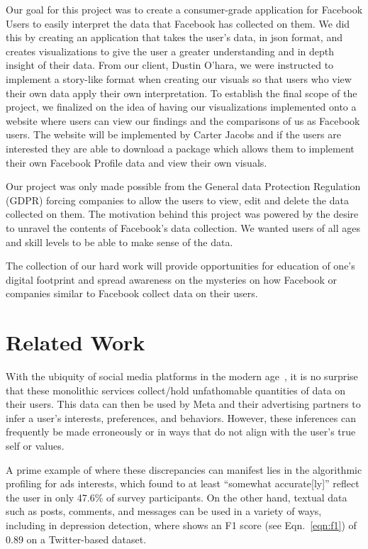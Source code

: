 \documentclass[conference, letterpaper, 11pt]{IEEEtran}
\begin{document}
Our goal for this project was to create a consumer-grade application for Facebook Users to easily interpret the data that Facebook has collected on them. We did this by creating an application that takes the user’s data, in json format, and creates visualizations to give the user a greater understanding and in depth insight of their data. From our client, Dustin O’hara, we were instructed to implement a story-like format when creating our visuals so that users who view their own data apply their own interpretation. To establish the final scope of the project, we finalized on the idea of having our visualizations implemented onto a website where users can view our findings and the comparisons of us as Facebook users. The website will be implemented by Carter Jacobs and if the users are interested they are able to download a package which allows them to implement their own Facebook Profile data and view their own visuals. 

Our project was only made possible from the General data Protection Regulation (GDPR) forcing companies to allow the users to view, edit and delete the data collected on them. The motivation behind this project was powered by the desire to unravel the contents of Facebook’s data collection. We wanted users of all ages and skill levels to be able to make sense of the data. 

The collection of our hard work will provide opportunities for education of one's digital footprint and spread awareness on the mysteries on how Facebook or companies similar to Facebook collect data on their users. 

\section{Related Work} \label{RW}

With the ubiquity of social media platforms in the modern age~\cite{metapress}, it is no surprise that these monolithic services collect/hold unfathomable quantities of data on their users. This data can then be used by Meta and their advertising partners to infer a user's interests, preferences, and behaviors. However, these inferences can frequently be made erroneously or in ways that do not align with the user's true self or values.

A prime example of where these discrepancies can manifest lies in the algorithmic profiling for ads interests, which \cite{algprof} found to at least “somewhat accurate[ly]” reflect the user in only 47.6\% of survey participants. On the other hand, textual data such as posts, comments, and messages can be used in a variety of ways, including in depression detection, where \cite{depression} shows an F1 score (see Eqn.~\ref{eqn:f1}) of 0.89 on a Twitter-based dataset.
\end{document}
